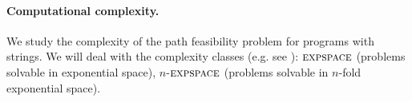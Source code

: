 
\paragraph{Computational complexity.} We study %
the complexity of the path feasibility problem for programs with 
strings. 
We will deal with the complexity
classes %
(e.g. see \cite{HU79}): $\textsc{expspace}$ (problems solvable
in exponential space), $n$-$\textsc{expspace}$ (problems solvable in $n$-fold exponential space). 


 
 

